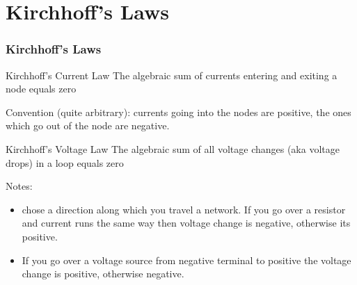 \documentclass[beamer]{standalone}
\begin{document}
\section{Kirchhoff's Laws}
\begin{frame}
 \frametitle{Kirchhoff's Laws}
	\begin{block}{Kirchhoff's Current Law}
		The algebraic sum of currents entering and exiting a node  equals zero
	\end{block}
	Convention (quite arbitrary): currents going into the nodes are positive, the ones which go
	out of the node are negative.
		
	\begin{block}{Kirchhoff's Voltage Law}
		The algebraic sum of all voltage changes (aka voltage drops) in a loop
		equals zero
	\end{block}
	Notes:
	\begin{itemize}
		\item 
			chose a direction along which you travel a network. If you go over
			a resistor and current runs the same way then voltage change is negative,
			otherwise its positive.
		\item 
			If you go over a voltage source from negative terminal to positive
			the voltage change is positive, otherwise negative.
	\end{itemize}
\end{frame}
\end{document}
